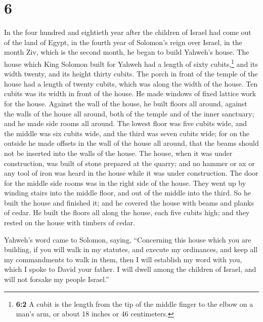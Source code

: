 \hypertarget{section-5}{%
\section{6}\label{section-5}}

 In the four hundred and eightieth year after the children
of Israel had come out of the land of Egypt, in the fourth year of
Solomon's reign over Israel, in the month Ziv, which is the second
month, he began to build Yahweh's house.  The house which
King Solomon built for Yahweh had a length of sixty cubits,\footnote{\textbf{6:2}
  A cubit is the length from the tip of the middle finger to the elbow
  on a man's arm, or about 18 inches or 46 centimeters.} and its width
twenty, and its height thirty cubits.  The porch in front
of the temple of the house had a length of twenty cubits, which was
along the width of the house. Ten cubits was its width in front of the
house.  He made windows of fixed lattice work for the
house.  Against the wall of the house, he built floors all
around, against the walls of the house all around, both of the temple
and of the inner sanctuary; and he made side rooms all around.
 The lowest floor was five cubits wide, and the middle was
six cubits wide, and the third was seven cubits wide; for on the outside
he made offsets in the wall of the house all around, that the beams
should not be inserted into the walls of the house.  The
house, when it was under construction, was built of stone prepared at
the quarry; and no hammer or ax or any tool of iron was heard in the
house while it was under construction.  The door for the
middle side rooms was in the right side of the house. They went up by
winding stairs into the middle floor, and out of the middle into the
third.  So he built the house and finished it; and he
covered the house with beams and planks of cedar.  He
built the floors all along the house, each five cubits high; and they
rested on the house with timbers of cedar.

 Yahweh's word came to Solomon, saying, 
``Concerning this house which you are building, if you will walk in my
statutes, and execute my ordinances, and keep all my commandments to
walk in them, then I will establish my word with you, which I spoke to
David your father.  I will dwell among the children of
Israel, and will not forsake my people Israel.''


